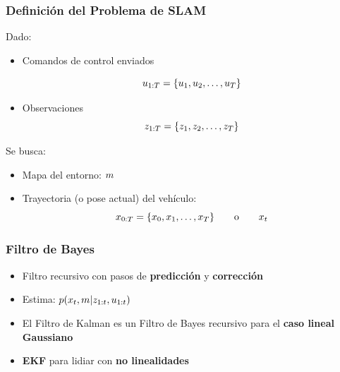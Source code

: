 \begin{frame}
    \frametitle{Definición del Problema de SLAM}

    Dado:
    \begin{itemize}
        \item Comandos de control enviados
        
        \begin{equation*}
            u_{1:T} = \{u_1, u_2, \ldots, u_T\}
        \end{equation*}
        \item Observaciones
        \begin{equation*}
            z_{1:T} = \{z_1, z_2, \ldots, z_T\}
        \end{equation*}
    \end{itemize}

    Se busca:
    \begin{itemize}
        \item Mapa del entorno: $m$
        \item Trayectoria (o pose actual) del vehículo:
        \begin{equation*}
            x_{0:T} = \{x_0, x_1, \ldots, x_T\} \qquad \text{o} \qquad x_{t}
        \end{equation*}
    \end{itemize}
\end{frame}

\begin{frame}
    \frametitle{Filtro de Bayes}

    \begin{itemize}
        \item Filtro recursivo con pasos de \textbf{predicción} y \textbf{corrección}
        \item Estima: $p(x_t, m | z_{1:t}, u_{1:t})$
        \item El Filtro de Kalman es un Filtro de Bayes recursivo para el \textbf{caso lineal Gaussiano}
        \item \textbf{EKF} para lidiar con \textbf{no linealidades}
    \end{itemize}
\end{frame}


